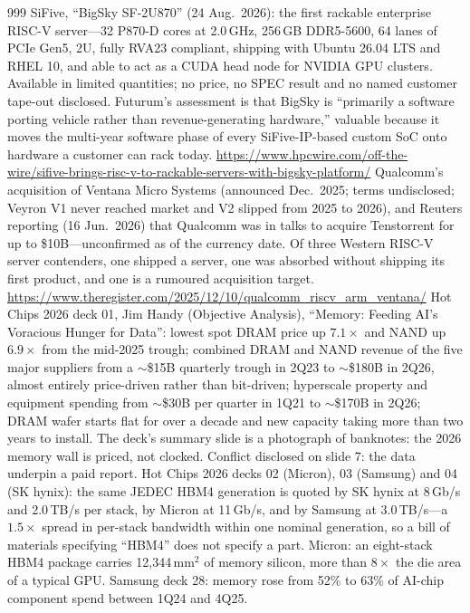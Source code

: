 \begin{thebibliography}{999}
 SiFive, ``BigSky SF-2U870'' (24 Aug.\ 2026): the first rackable enterprise RISC-V server---32 P870-D cores at 2.0\,GHz, 256\,GB DDR5-5600, 64 lanes of PCIe Gen5, 2U, fully RVA23 compliant, shipping with Ubuntu 26.04 LTS and RHEL 10, and able to act as a CUDA head node for NVIDIA GPU clusters. Available in limited quantities; no price, no SPEC result and no named customer tape-out disclosed. Futurum's assessment is that BigSky is ``primarily a software porting vehicle rather than revenue-generating hardware,'' valuable because it moves the multi-year software phase of every SiFive-IP-based custom SoC onto hardware a customer can rack today. \url{https://www.hpcwire.com/off-the-wire/sifive-brings-risc-v-to-rackable-servers-with-bigsky-platform/}
 Qualcomm's acquisition of Ventana Micro Systems (announced Dec.\ 2025; terms undisclosed; Veyron V1 never reached market and V2 slipped from 2025 to 2026), and Reuters reporting (16 Jun.\ 2026) that Qualcomm was in talks to acquire Tenstorrent for up to \$10B---unconfirmed as of the currency date. Of three Western RISC-V server contenders, one shipped a server, one was absorbed without shipping its first product, and one is a rumoured acquisition target. \url{https://www.theregister.com/2025/12/10/qualcomm_riscv_arm_ventana/}
 Hot Chips 2026 deck 01, Jim Handy (Objective Analysis), ``Memory: Feeding AI's Voracious Hunger for Data'': lowest spot DRAM price up $7.1\times$ and NAND up $6.9\times$ from the mid-2025 trough; combined DRAM and NAND revenue of the five major suppliers from a $\sim$\$15B quarterly trough in 2Q23 to $\sim$\$180B in 2Q26, almost entirely price-driven rather than bit-driven; hyperscale property and equipment spending from $\sim$\$30B per quarter in 1Q21 to $\sim$\$170B in 2Q26; DRAM wafer starts flat for over a decade and new capacity taking more than two years to install. The deck's summary slide is a photograph of banknotes: the 2026 memory wall is priced, not clocked. Conflict disclosed on slide 7: the data underpin a paid report.
 Hot Chips 2026 decks 02 (Micron), 03 (Samsung) and 04 (SK hynix): the same JEDEC HBM4 generation is quoted by SK hynix at 8\,Gb/s and 2.0\,TB/s per stack, by Micron at 11\,Gb/s, and by Samsung at 3.0\,TB/s---a $1.5\times$ spread in per-stack bandwidth within one nominal generation, so a bill of materials specifying ``HBM4'' does not specify a part. Micron: an eight-stack HBM4 package carries 12{,}344\,mm$^2$ of memory silicon, more than $8\times$ the die area of a typical GPU. Samsung deck 28: memory rose from 52\% to 63\% of AI-chip component spend between 1Q24 and 4Q25.

\end{thebibliography}
